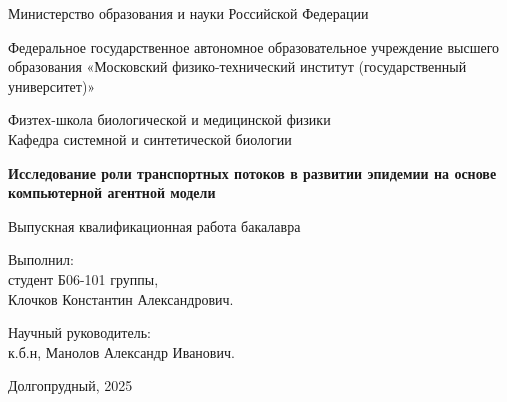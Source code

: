 \documentclass[a4paper,12pt]{article} %
\begin{document}
\begin{titlepage}

\begin{center}
    {\large Министерство образования и науки Российской Федерации}
\end{center}
\begin{center}
    {\large Федеральное государственное автономное 
образовательное учреждение высшего образования 
«Московский физико-технический институт 
(государственный университет)»}
\end{center}
\begin{center}
    {\large Физтех-школа биологической и медицинской физики \\ Кафедра системной и синтетической биологии}
\end{center}

    \vspace{3.5cm}


\vspace{0.1cm}
{\huge
\begin{center}
    \textbf{Исследование роли транспортных потоков в развитии эпидемии на основе компьютерной агентной модели}
   \\
\end{center}
}
{\large
\begin{center}
    Выпускная квалификационная работа бакалавра
   \\
\end{center}
}

\vspace{3.5cm}

\begin{flushright}
\large Выполнил:\\ студент Б06-101 группы, \\Клочков Константин Александрович.
\vspace{0.2cm}
\end{flushright}

\begin{flushright}
\large Научный руководитель: \\ к.б.н, Манолов Александр Иванович.
\vspace{0.2cm}
\end{flushright}

\vspace{2.5cm}

\begin{center}
    Долгопрудный, 2025
\end{center}

\end{titlepage}
\end{document}
